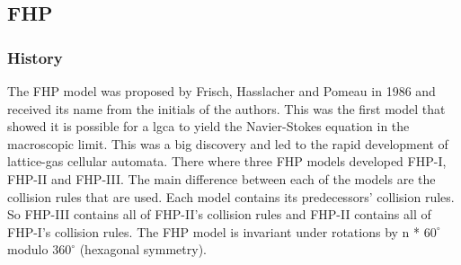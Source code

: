 \documentclass[a4paper,12pt]{article}
\begin{document}
\subsection{FHP}
\subsubsection{History}
The FHP model was proposed by Frisch, Hasslacher and Pomeau in 1986 and received its name from the initials of the authors. This was the first model that showed it is possible for a \acrshort{lgca} to yield the Navier-Stokes equation in the macroscopic limit. This was a big discovery and led to the rapid development of lattice-gas cellular automata. There where three FHP models developed FHP-I, FHP-II and FHP-III.
The main difference between each of the models are the collision rules that are used.
Each model contains its predecessors' collision rules. So FHP-III contains all of FHP-II's collision rules and FHP-II contains all of FHP-I's collision rules. 
The FHP model is invariant under rotations by n * $60^{\circ}$ modulo $360^{\circ}$ (hexagonal symmetry).
\end{document}
